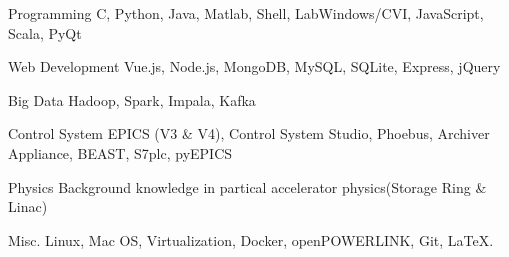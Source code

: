 

\begin{cvskills}

  \cvskill
    {Programming} %
    {C, Python, Java, Matlab, Shell, LabWindows/CVI, JavaScript, Scala, PyQt} %

  \cvskill
    {Web Development} %
    {Vue.js, Node.js, MongoDB, MySQL, SQLite, Express, jQuery} %

  \cvskill
	{Big Data} %
    {Hadoop, Spark, Impala, Kafka} %

  \cvskill
   {Control System} %
   {EPICS (V3 \& V4), Control System Studio, Phoebus, Archiver Appliance, BEAST, S7plc, pyEPICS} %

  \cvskill
    {Physics} %
    {Background knowledge in partical accelerator physics(Storage Ring \& Linac)} %

  \cvskill
    {Misc.} %
    {Linux, Mac OS, Virtualization, Docker, openPOWERLINK, Git, \LaTeX.} %
  
\end{cvskills}
